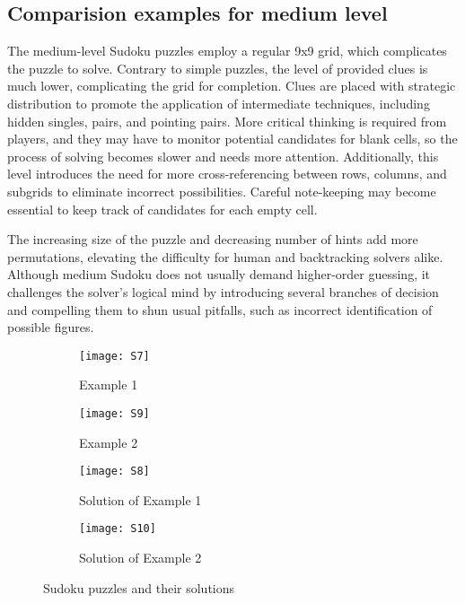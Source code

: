 \documentclass[conference]{IEEEtran}
\begin{document}
\subsection{Comparision examples for medium level}
The medium-level Sudoku puzzles employ a regular 9x9 grid, which complicates the puzzle to solve. Contrary to simple puzzles, the level of provided clues is much lower, complicating the grid for completion. Clues are placed with strategic distribution to promote the application of intermediate techniques, including hidden singles, pairs, and pointing pairs. More critical thinking is required from players, and they may have to monitor potential candidates for blank cells, so the process of solving becomes slower and needs more attention. Additionally, this level introduces the need for more cross-referencing between rows, columns, and subgrids to eliminate incorrect possibilities. Careful note-keeping may become essential to keep track of candidates for each empty cell.

The increasing size of the puzzle and decreasing number of hints add more permutations, elevating the difficulty for human and backtracking solvers alike. Although medium Sudoku does not usually demand higher-order guessing, it challenges the solver's logical mind by introducing several branches of decision and compelling them to shun usual pitfalls, such as incorrect identification of possible figures.

\begin{figure}[H]
    \centering
    \setlength{\abovecaptionskip}{4pt} 
    \setlength{\belowcaptionskip}{4pt}
    
    \begin{multicols}{2}  
    
    \begin{subfigure}{\linewidth}
        \centering
        \texttt{[image: S7]} 
        \caption{Example 1}
        \label{fig:s7}
    \end{subfigure}
    
    \begin{subfigure}{\linewidth}
        \centering
        \texttt{[image: S9]} 
        \caption{Example 2}
        \label{fig:s9}
    \end{subfigure}
    
    \columnbreak 
    
    \begin{subfigure}{\linewidth}
        \centering
        \texttt{[image: S8]} 
        \caption{Solution of Example 1}
        \label{fig:s8}
    \end{subfigure}
    
    \begin{subfigure}{\linewidth}
        \centering
        \texttt{[image: S10]} 
        \caption{Solution of Example 2}
        \label{fig:s10}
    \end{subfigure}
    
    \end{multicols}
    
    \caption{Sudoku puzzles and their solutions}
\end{figure}
\end{document}
